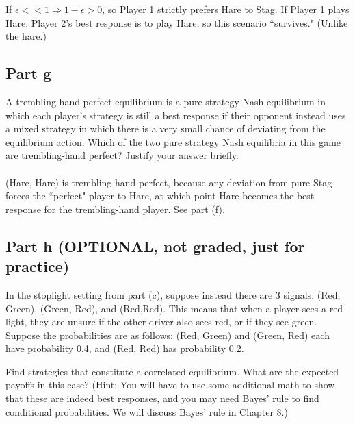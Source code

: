 \documentclass[10pt]{article}
\begin{document}
If $\epsilon << 1 \Longrightarrow 1 - \epsilon > 0$, so Player 1 strictly prefers Hare to Stag. If Player 1 plays Hare, Player 2's best response is to play Hare, so this scenario ``survives." (Unlike the hare.)
\newpage

\subsection*{Part g} A trembling-hand perfect equilibrium is a pure strategy Nash equilibrium in which each player's strategy is still a best response if their opponent instead uses a mixed strategy in which there is a very small chance of deviating from the equilibrium action. Which of the two pure strategy Nash equilibria in this game are trembling-hand perfect? Justify your answer briefly.
\\ \\ 
(Hare, Hare) is trembling-hand perfect, because any deviation from pure Stag forces the ``perfect" player to Hare, at which point Hare becomes the best response for the trembling-hand player. See part (f).

\newpage

\subsection*{Part h (OPTIONAL, not graded, just for practice)} In the stoplight setting from part (c), suppose instead there are 3 signals: (Red, Green), (Green, Red), and (Red,Red). This means that when a player sees a red light, they are unsure if the other driver also sees red, or if they see green. Suppose the probabilities are as follows: (Red, Green) and (Green, Red) each have probability 0.4, and (Red, Red) has probability 0.2.

Find strategies that constitute a correlated equilibrium. What are the expected payoffs in this case? (Hint: You will have to use some additional math to show that these are indeed best responses, and you may need Bayes' rule to find conditional probabilities. We will discuss Bayes' rule in Chapter 8.)
\end{document}
